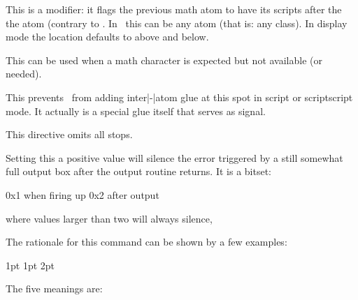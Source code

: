 \stopoldprimitive

\startoldprimitive[title={\prm {nolimits}}]

This is a modifier: it flags the previous math atom to have its scripts after the
the atom (contrary to . In \LUAMETATEX\ this can be any atom (that
is: any class). In display mode the location defaults to above and below.

\stopoldprimitive

\startnewprimitive[title={\prm {nomathchar}}]

This can be used when a math character is expected but not available (or needed).

\stopnewprimitive

\startoldprimitive[title={\prm {nonscript}}]

This prevents \TEX\ from adding inter|-|atom glue at this spot in script or
scriptscript mode. It actually is a special glue itself that serves as signal.

\stopoldprimitive

\startoldprimitive[title={\prm {nonstopmode}}]

This directive omits all stops.

\stopoldprimitive

\startnewprimitive[title={\prm {nooutputboxerror}}]

Setting this a positive value will silence the error triggered by a still
somewhat full output box after the output routine returns. It is a bitset:

\starttabulate[|T||]
\NC 0x1 \NC when firing up \NC \NR
\NC 0x2 \NC after output   \NC \NR
\stoptabulate

where values larger than two will always silence,

\stopnewprimitive

\startnewprimitive[title={\prm {norelax}}]

The rationale for this command can be shown by a few examples:

\startbuffer
{} 1pt  1pt  2pt
\edef\testa{\ifdim\dimen0=\dimen2\norelax N\else Y\fi}
\edef\testb{\ifdim\dimen0=\dimen2\relax   N\else Y\fi}
\edef\testc{\ifdim\dimen0=\dimen4\norelax N\else Y\fi}
\edef\testd{\ifdim\dimen0=\dimen4\relax   N\else Y\fi}
\edef\teste{\norelax}
\stopbuffer

\typebuffer

The five meanings are:

\start \getbuffer \starttabulate[|T|T|]
\NC \string\testa \NC \meaning\testa \NC \NR
\NC \string\testb \NC \meaning\testb \NC \NR
\NC \string\testc \NC \meaning\testc \NC \NR
\NC \string\testd \NC \meaning\testd \NC \NR
\NC \string\teste \NC \meaning\teste \NC \NR
\stoptabulate \stop

